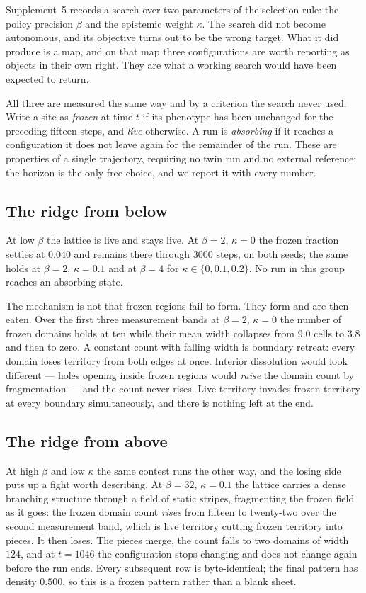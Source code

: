Supplement~5 records a search over two parameters of the selection rule: the
policy precision $\beta$ and the epistemic weight $\kappa$. The search did not
become autonomous, and its objective turns out to be the wrong target. What it
did produce is a map, and on that map three configurations are worth reporting
as objects in their own right. They are what a working search would have been
expected to return.

All three are measured the same way and by a criterion the search never used.
Write a site as \emph{frozen} at time $t$ if its phenotype has been unchanged for
the preceding fifteen steps, and \emph{live} otherwise. A run is \emph{absorbing}
if it reaches a configuration it does not leave again for the remainder of the
run. These are properties of a single
trajectory, requiring no twin run and no external reference; the horizon is the
only free choice, and we report it with every number.

\subsection{The ridge from below}

At low $\beta$ the lattice is live and stays live. At $\beta = 2$, $\kappa = 0$
the frozen fraction settles at $0.040$ and remains there through $3000$ steps, on
both seeds; the same holds at $\beta = 2$, $\kappa = 0.1$ and at $\beta = 4$ for
$\kappa \in \{0, 0.1, 0.2\}$. No run in this group reaches an absorbing state.

The mechanism is not that frozen regions fail to form. They form and are then
eaten. Over the first three measurement bands at $\beta = 2$, $\kappa = 0$ the
number of frozen domains holds at ten while their mean width collapses from
$9.0$ cells to $3.8$ and then to zero. A constant count with falling width is
boundary retreat: every domain loses territory from both edges at once. Interior
dissolution would look different --- holes opening inside frozen regions would
\emph{raise} the domain count by fragmentation --- and the count never rises.
Live territory invades frozen territory at every boundary simultaneously, and
there is nothing left at the end.

\subsection{The ridge from above}

At high $\beta$ and low $\kappa$ the same contest runs the other way, and the
losing side puts up a fight worth describing. At $\beta = 32$, $\kappa = 0.1$
the lattice carries a dense branching structure through a field of static
stripes, fragmenting the frozen field as it goes: the frozen domain count
\emph{rises} from fifteen to twenty-two over the second measurement band, which
is live territory cutting frozen territory into pieces. It then loses. The
pieces merge, the count falls to two domains of width $124$, and at $t = 1046$
the configuration stops changing and does not change again before the run
ends. Every subsequent row is
byte-identical; the final pattern has density $0.500$, so this is a frozen
pattern rather than a blank sheet.

